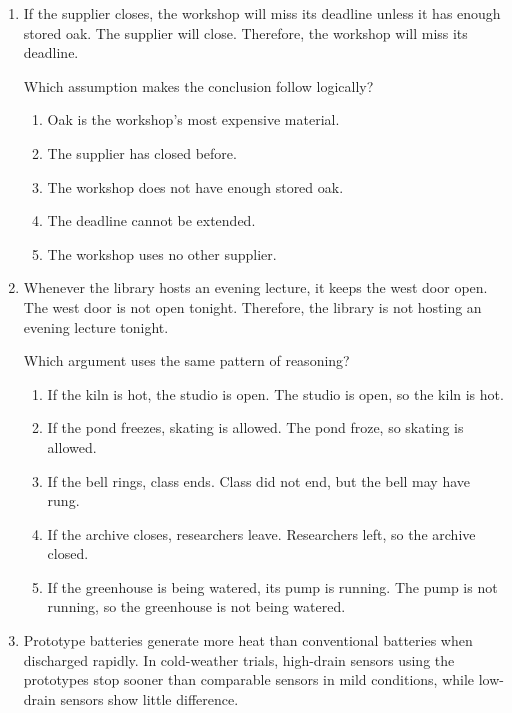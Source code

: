 \begin{enumerate}
\item If the supplier closes, the workshop will miss its deadline unless it has enough stored oak. The supplier will close. Therefore, the workshop will miss its deadline.

Which assumption makes the conclusion follow logically?
\begin{enumerate}
\item[(A)] Oak is the workshop's most expensive material.
\item[(B)] The supplier has closed before.
\item[(C)] The workshop does not have enough stored oak.
\item[(D)] The deadline cannot be extended.
\item[(E)] The workshop uses no other supplier.
\end{enumerate}

\item Whenever the library hosts an evening lecture, it keeps the west door open. The west door is not open tonight. Therefore, the library is not hosting an evening lecture tonight.

Which argument uses the same pattern of reasoning?
\begin{enumerate}
\item[(A)] If the kiln is hot, the studio is open. The studio is open, so the kiln is hot.
\item[(B)] If the pond freezes, skating is allowed. The pond froze, so skating is allowed.
\item[(C)] If the bell rings, class ends. Class did not end, but the bell may have rung.
\item[(D)] If the archive closes, researchers leave. Researchers left, so the archive closed.
\item[(E)] If the greenhouse is being watered, its pump is running. The pump is not running, so the greenhouse is not being watered.
\end{enumerate}

\item Prototype batteries generate more heat than conventional batteries when discharged rapidly. In cold-weather trials, high-drain sensors using the prototypes stop sooner than comparable sensors in mild conditions, while low-drain sensors show little difference.


\end{enumerate}
